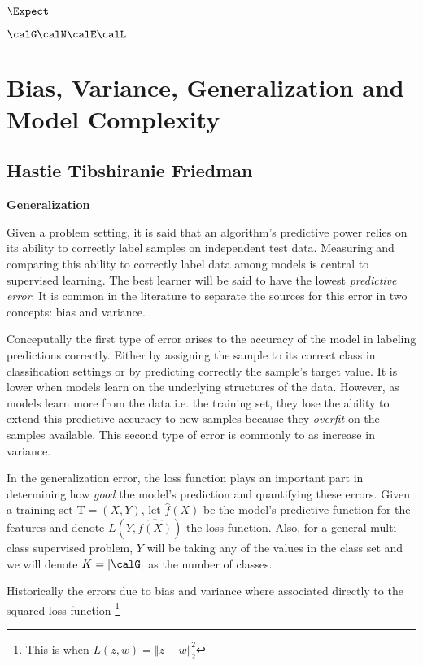  
$\Expect$

$\calG \calN \calE \calL$

\section{Bias, Variance, Generalization and Model Complexity}


\subsection{Hastie Tibshiranie Friedman}

\textbf{Generalization}

Given a problem setting, it is said that an algorithm's predictive power relies on its ability to correctly label samples on independent test data. Measuring and comparing this ability to correctly label data among models is central to supervised learning.  The best learner will be said to have the lowest \textit{predictive error}. It is common in the literature \cite{james-biasVarianceGeneral} to separate the sources for this error in two concepts: bias and variance.

Conceputally the first type of error arises to the accuracy of the model in labeling predictions correctly. Either by assigning the sample to its correct class in classification settings or by predicting correctly the sample's target value. It is lower when models learn on the underlying structures of the data. However, as models learn more from the data i.e. the training set, they lose the ability to extend this predictive accuracy to new samples because they \textit{overfit} on the samples available. This second type of error is commonly to as increase in variance.

In the generalization error, the loss function plays an important part in determining how \textit{good} the model's prediction and quantifying these errors. Given a training set $\mathrm{T} = (X,Y)$, let $\hat{f}(X)$ be the model's predictive function for the features and denote $L( Y,\hat{f(X)} )$ the loss function. Also, for a general multi-class supervised problem, $Y$ will be taking any of the values in the class set \calG and we will denote $K = |\calG|$ as the number of classes.

Historically the errors due to bias and variance where associated directly to the squared loss function \footnote{This is when $L(z,w) = \left\Vert z-w \right\Vert^2_2$}


\cite{james-biasVarianceGeneral}

